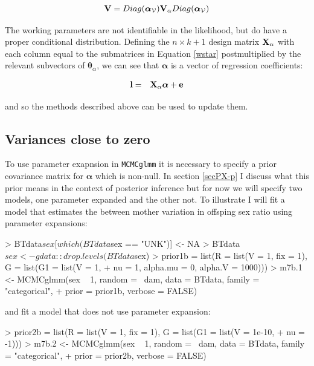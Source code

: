 \documentclass{article}
\begin{document}
\begin{equation} 
{\bf V} = Diag({\bm \alpha}_{\mathcal{V}}){\bf V}_{\alpha}Diag({\bm \alpha}_{\mathcal{V}})
\end{equation} 


The working parameters are not identifiable in the likelihood, but do have a proper conditional distribution. Defining the $n\times k+1$ design matrix ${\bf X}_{\alpha}$ with each column equal to the submatrices in Equation \ref{wstar} postmultiplied by the relevant subvectors of ${\bm \theta}_{\alpha}$, we can see that ${\bm \alpha}$ is a vector of regression coefficients: 

\begin{equation}
\begin{array}{rl}
\bf{l} =& {\bf X}_{\alpha}{\bm \alpha}+\bf{e}\\
\end{array}
\end{equation}

and so the methods described above can be used to update them. 

\subsection{Variances close to zero}

To use parameter exapnsion in \texttt{MCMCglmm} it is necessary to specify a prior covariance matrix for ${\bm \alpha}$ which is non-null. In section \ref{secPX-p} I discuss what this prior means in the context of posterior inference but for now we will specify two models, one parameter expanded and the other not. To illustrate I will fit a model that estimates the between mother variation in offsping sex ratio using parameter expansions:

\begin{Schunk}
\begin{Sinput}
> BTdata$sex[which(BTdata$sex == "UNK")] <- NA
> BTdata$sex <- gdata::drop.levels(BTdata$sex)
> prior1b = list(R = list(V = 1, fix = 1), G = list(G1 = list(V = 1, 
+     nu = 1, alpha.mu = 0, alpha.V = 1000)))
> m7b.1 <- MCMCglmm(sex ~ 1, random = ~dam, data = BTdata, family = "categorical", 
+     prior = prior1b, verbose = FALSE)
\end{Sinput}
\end{Schunk}

and fit a model that does not use parameter expansion:

\begin{Schunk}
\begin{Sinput}
> prior2b = list(R = list(V = 1, fix = 1), G = list(G1 = list(V = 1e-10, 
+     nu = -1)))
> m7b.2 <- MCMCglmm(sex ~ 1, random = ~dam, data = BTdata, family = "categorical", 
+     prior = prior2b, verbose = FALSE)
\end{Sinput}
\end{Schunk}
\end{document}
